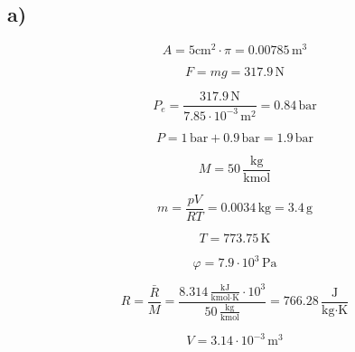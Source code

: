 

\subsection*{a)}

\[
A = 5 \text{cm}^2 \cdot \pi = 0.00785 \, \text{m}^3
\]

\[
F = mg = 317.9 \, \text{N}
\]

\[
P_e = \frac{317.9 \, \text{N}}{7.85 \cdot 10^{-3} \, \text{m}^2} = 0.84 \, \text{bar}
\]

\[
P = 1 \, \text{bar} + 0.9 \, \text{bar} = 1.9 \, \text{bar}
\]

\[
M = 50 \, \frac{\text{kg}}{\text{kmol}}
\]

\[
m = \frac{pV}{RT} = 0.0034 \, \text{kg} = 3.4 \, \text{g}
\]

\[
T = 773.75 \, \text{K}
\]

\[
\varphi = 7.9 \cdot 10^3 \, \text{Pa}
\]

\[
R = \frac{\bar{R}}{M} = \frac{8.314 \, \frac{\text{kJ}}{\text{kmol} \cdot \text{K}} \cdot 10^3}{50 \, \frac{\text{kg}}{\text{kmol}}} = 766.28 \, \frac{\text{J}}{\text{kg} \cdot \text{K}}
\]

\[
V = 3.14 \cdot 10^{-3} \, \text{m}^3
\]